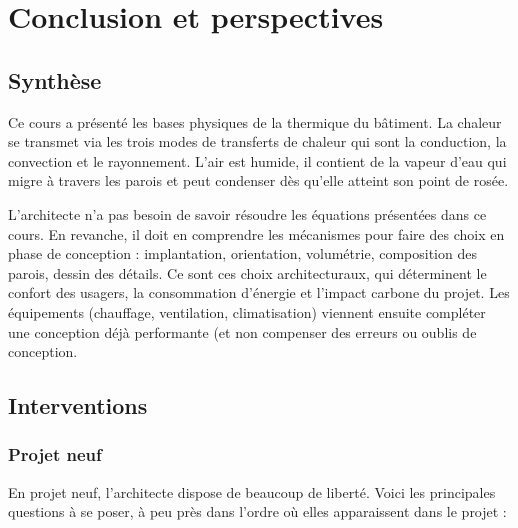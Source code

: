 \part{Conclusion et perspectives}

\chapter{Synthèse}

Ce cours a présenté les bases physiques de la thermique du bâtiment. La chaleur se transmet via les trois modes de transferts de chaleur qui sont la conduction, la convection et le rayonnement.
L'air est humide, il contient de la vapeur d'eau qui migre à travers les parois et peut condenser dès qu'elle atteint son point de rosée.

L'architecte n'a pas besoin de savoir résoudre les équations présentées dans ce cours. En revanche, il doit en comprendre les mécanismes pour faire des choix en phase de conception : implantation, orientation, volumétrie, composition des parois, dessin des détails. Ce sont ces choix architecturaux, qui déterminent le confort des usagers, la consommation d'énergie et l'impact carbone du projet. Les équipements (chauffage, ventilation, climatisation) viennent ensuite compléter une conception déjà performante (et non compenser des erreurs ou oublis de conception.

\chapter{Interventions}

\section{Projet neuf}

En projet neuf, l'architecte dispose de beaucoup de liberté. Voici les principales questions à se poser, à peu près dans l'ordre où elles apparaissent dans le projet :

